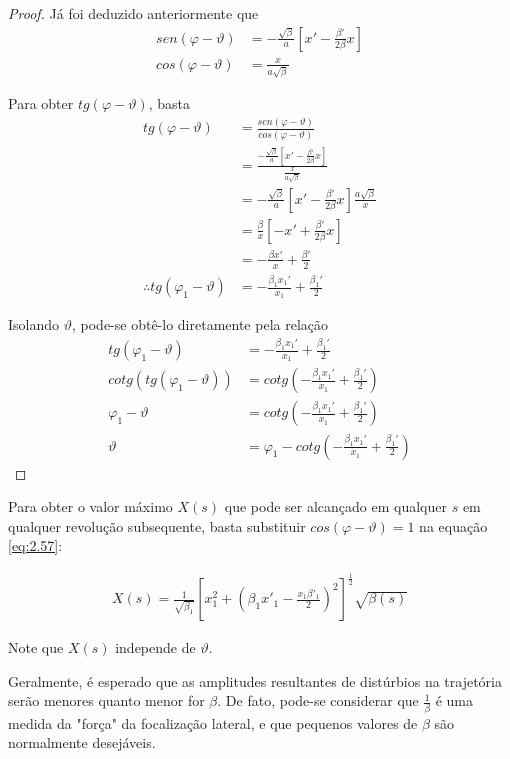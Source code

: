 \begin{proof}
	Já foi deduzido anteriormente que
	\begin{align*}
        sen(\varphi-\vartheta) &= -\frac{\sqrt{\beta}}{a}\left[x' - \frac{\beta'}{2\beta}x\right]\\
        cos(\varphi-\vartheta) &= \frac{x}{a\sqrt{\beta}}
	\end{align*}
	
	Para obter $tg(\varphi-\vartheta)$, basta
	\begin{align*}
		tg(\varphi-\vartheta) &= \frac{sen(\varphi-\vartheta)}{cos(\varphi-\vartheta)}\\
							 &= \frac{-\frac{\sqrt{\beta}}{a}\left[x' - \frac{\beta'}{2\beta}x\right]}{\frac{x}{a\sqrt{\beta}}}\\
							 &= -\frac{\sqrt{\beta}}{a}\left[x' - \frac{\beta'}{2\beta}x\right] \frac{a\sqrt{\beta}}{x}\\
							 &= \frac{\beta}{x}\left[-x' + \frac{\beta'}{2\beta}x\right]\\
							 &= -\frac{\beta x'}{x} + \frac{\beta'}{2}\\
		\therefore tg(\varphi_1-\vartheta) &= -\frac{\beta_1  x_1'}{x_1} + \frac{\beta_1'}{2}
	\end{align*}
	
	Isolando $\vartheta$, pode-se obtê-lo diretamente pela relação
	\begin{align*}
		tg(\varphi_1-\vartheta) &= -\frac{\beta_1  x_1'}{x_1} + \frac{\beta_1'}{2}\\
		cotg(tg(\varphi_1-\vartheta)) &= cotg\left(-\frac{\beta_1  x_1'}{x_1} + \frac{\beta_1'}{2}\right)\\
		\varphi_1-\vartheta &= cotg\left(-\frac{\beta_1  x_1'}{x_1} + \frac{\beta_1'}{2}\right)\\
		\vartheta &= \varphi_1 - cotg\left(-\frac{\beta_1  x_1'}{x_1} + \frac{\beta_1'}{2}\right)
	\end{align*}
\end{proof}
	
Para obter o valor máximo $X(s)$ que pode ser alcançado em qualquer $s$ em qualquer revolução subsequente, basta substituir $cos(\varphi-\vartheta)=1$ na equação \eqref{eq:2.57}:
	
\begin{align}
	X(s) = \frac{1}{\sqrt{\beta_1}}\left[x_1^2+\left(\beta_1x'_1-\frac{x_1\beta'_1}{2}\right)^2\right]^\frac{1}{2}\sqrt{\beta(s)}
\end{align}
	
Note que $X(s)$ independe de $\vartheta$.
	
Geralmente, é esperado que as amplitudes resultantes de distúrbios na trajetória serão menores quanto menor for $\beta$. De fato, pode-se considerar que $\frac{1}{\beta}$ é uma medida da "força" da focalização lateral, e que pequenos valores de $\beta$ são normalmente desejáveis. 